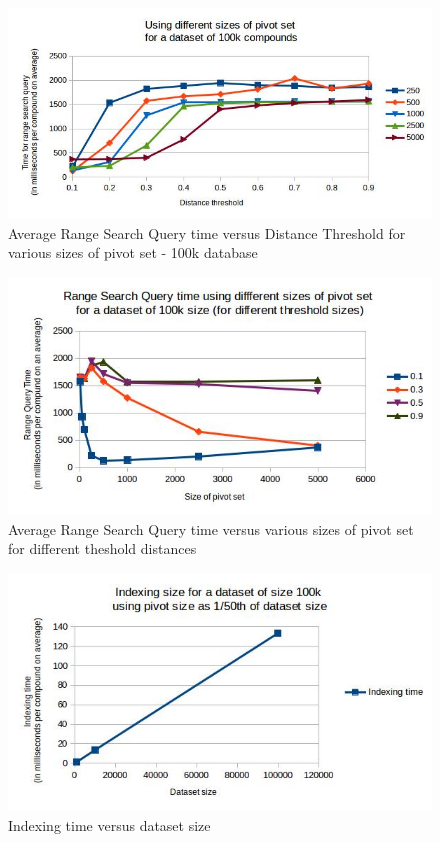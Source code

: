\begin{figure}[ht]	
\centering
\includegraphics[width=1 \columnwidth]{img/image4.jpg}
\caption{Average Range Search Query time versus Distance Threshold for various sizes of pivot set - 100k database}
\label{fig:5.4}
\end{figure}



\begin{figure}[ht]	
\centering
\includegraphics[width=1 \columnwidth]{img/image5.jpg}
\caption{Average Range Search Query time versus various sizes of pivot set for different theshold distances}
\label{fig:5.5}
\end{figure}



\begin{figure}[ht]	
\centering
\includegraphics[width=1 \columnwidth]{img/image6.jpg}
\caption{Indexing time versus dataset size}
\label{fig:5.6}
\end{figure}




